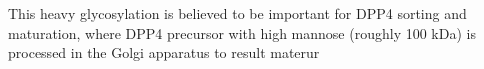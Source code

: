 This heavy glycosylation is believed to be important for DPP4 sorting and maturation, where DPP4 precursor with high mannose (roughly 100 kDa) is processed in the Golgi apparatus to result materur \cite{Matter_1991}
